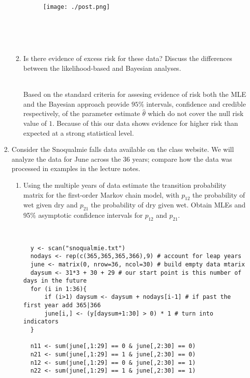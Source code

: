 \documentclass{article} %
\begin{document}
\begin{enumerate}
\begin{enumerate}
\begin{figure}[h!t]
\centerline{
	\texttt{[image: ./post.png]}
}
\end{figure}

~ \\
~ \\
~ \\

\item Is there evidence of excess risk for these data? Discuss the differences between the likelihood-based and Bayesian analyses.

~ \\
Based on the standard criteria for assesing evidence of risk both the MLE and
the Bayesian approach provide $95\%$ intervals, confidence and credible respectively,
of the parameter estimate $\hat{\theta}$ which do not cover the null risk value
of $1$. Because of this our data shows evidence for higher risk than
expected at a strong statistical level.

\end{enumerate}
\item Consider the Snoqualmie falls data available on the class
  website.
  We will analyze the
  data for June across the 36 years; compare how the data was
  processed in examples in the lecture notes.
\begin{enumerate}
\item Using the multiple years of data estimate the transition
  probability matrix for the first-order Markov chain model, with
  $p_{12}$
  the probability of wet given dry and $p_{21}$
  the probability of dry given wet.  Obtain MLEs and 95\% asymptotic
  confidence intervals for $p_{12}$ and $p_{21}$.

~ \\

\begin{lstlisting}
  y <- scan("snoqualmie.txt")
  nodays <- rep(c(365,365,365,366),9) # account for leap years
  june <- matrix(0, nrow=36, ncol=30) # build empty data mtarix
  daysum <- 31*3 + 30 + 29 # our start point is this number of days in the future
  for (i in 1:36){
      if (i>1) daysum <- daysum + nodays[i-1] # if past the first year add 365|366
      june[i,] <- (y[daysum+1:30] > 0) * 1 # turn into indicators
  }

  n11 <- sum(june[,1:29] == 0 & june[,2:30] == 0)
  n21 <- sum(june[,1:29] == 1 & june[,2:30] == 0)
  n12 <- sum(june[,1:29] == 0 & june[,2:30] == 1)
  n22 <- sum(june[,1:29] == 1 & june[,2:30] == 1)


\end{lstlisting}
\end{enumerate}
\end{enumerate}
\end{document}
